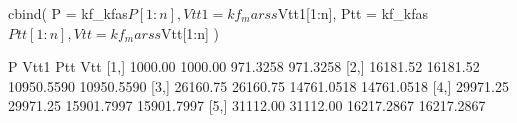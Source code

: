 \begin{Schunk}
\begin{Sinput}
 cbind(
   P = kf_kfas$P[1:n], Vtt1 = kf_marss$Vtt1[1:n],
   Ptt = kf_kfas$Ptt[1:n], Vtt = kf_marss$Vtt[1:n]
 )
\end{Sinput}
\begin{Soutput}
            P     Vtt1        Ptt        Vtt
[1,]  1000.00  1000.00   971.3258   971.3258
[2,] 16181.52 16181.52 10950.5590 10950.5590
[3,] 26160.75 26160.75 14761.0518 14761.0518
[4,] 29971.25 29971.25 15901.7997 15901.7997
[5,] 31112.00 31112.00 16217.2867 16217.2867
\end{Soutput}
\end{Schunk}
